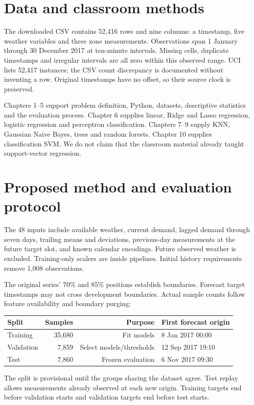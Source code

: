 \documentclass[11pt,a4paper]{article}
\begin{document}
\section{Data and classroom methods}
The downloaded CSV contains 52,416 rows and nine columns: a timestamp, five weather variables and three zone measurements. Observations span 1 January through 30 December 2017 at ten-minute intervals. Missing cells, duplicate timestamps and irregular intervals are all zero within this observed range. UCI lists 52,417 instances; the CSV count discrepancy is documented without inventing a row. Original timestamps have no offset, so their source clock is preserved.

Chapters 1--5 support problem definition, Python, datasets, descriptive statistics and the evaluation process. Chapter 6 supplies linear, Ridge and Lasso regression, logistic regression and perceptron classification. Chapters 7--9 supply KNN, Gaussian Naive Bayes, trees and random forests. Chapter 10 supplies classification SVM. We do not claim that the classroom material already taught support-vector regression.

\section{Proposed method and evaluation protocol}
The 48 inputs include available weather, current demand, lagged demand through seven days, trailing means and deviations, previous-day measurements at the future target slot, and known calendar encodings. Future observed weather is excluded. Training-only scalers are inside pipelines. Initial history requirements remove 1,008 observations.

The original series' 70\% and 85\% positions establish boundaries. Forecast target timestamps may not cross development boundaries. Actual sample counts follow feature availability and boundary purging:
\begin{center}
\begin{tabular}{lrrl}\toprule
Split & Samples & Purpose & First forecast origin\\\midrule
Training & 35,680 & Fit models & 8 Jan 2017 00:00\\
Validation & 7,859 & Select models/thresholds & 12 Sep 2017 19:10\\
Test & 7,860 & Frozen evaluation & 6 Nov 2017 09:30\\\bottomrule
\end{tabular}
\end{center}
The split is provisional until the groups sharing the dataset agree. Test replay allows measurements already observed at each new origin. Training targets end before validation starts and validation targets end before test starts.
\end{document}
